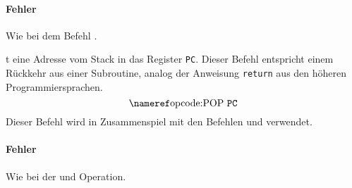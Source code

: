 \paragraph{Fehler}
Wie bei dem Befehl .


t eine Adresse vom Stack in das Register \texttt{PC}. Dieser Befehl
entspricht einem Rückkehr aus einer Subroutine, analog der Anweisung
\texttt{return} aus den höheren Programmiersprachen.
\[
  \text{\opref{POP} \texttt{PC}} 
\]
Dieser Befehl wird in Zusammenspiel mit den Befehlen  und
 verwendet.

\paragraph{Fehler}
Wie bei der  und  Operation.

